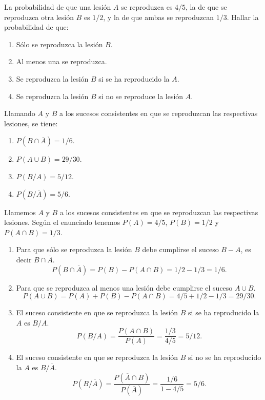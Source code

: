 {La probabilidad de que una lesión $A$ se reproduzca es $4/5$, la de que se reproduzca otra lesión $B$ es $1/2$, y la de que ambas se
reproduzcan $1/3$. Hallar la probabilidad de que:
\begin{enumerate}
\item Sólo se reproduzca la lesión $B$.
\item Al menos una se reproduzca.
\item Se reproduzca la lesión $B$ si se ha reproducido la $A$.
\item Se reproduzca la lesión $B$ si no se reproduce la lesión $A$.
\end{enumerate}
}
{Llamando $A$ y $B$ a los sucesos consistentes en que se reproduzcan las respectivas lesiones, se tiene:
\begin{enumerate}
\item $P(B\cap\overline{A})=1/6$.
\item $P(A\cup B)=29/30$.
\item $P(B/A)=5/12$.
\item $P(B/\overline{A})=5/6$.
\end{enumerate}
}
{Llamemos $A$ y $B$ a los sucesos consistentes en que se reproduzcan las respectivas lesiones. Según el enunciado tenemos
$P(A)=4/5$, $P(B)=1/2$ y $P(A\cap B)=1/3$.

\begin{enumerate}
\item Para que sólo se reproduzca la lesión $B$ debe cumplirse el suceso $B-A$, es decir $B\cap\overline{A}$.
\[P(B\cap\overline{A})=P(B)-P(A\cap B)=1/2-1/3=1/6.\]

\item Para que se reproduzca al menos una lesión debe cumplirse el suceso $A\cup B$.
\[P(A\cup B)=P(A)+P(B)-P(A\cap B)=4/5+1/2-1/3=29/30.\]

\item El suceso consistente en que se reproduzca la lesión $B$ si se ha reproducido la $A$ es $B/A$.
\[P(B/A)=\frac{P(A\cap B)}{P(A)}=\frac{1/3}{4/5}=5/12.\]

\item El suceso consistente en que se reproduzca la lesión $B$ si no se ha reproducido la $A$ es $B/\overline{A}$.
\[P(B/\overline{A})=\frac{P(\overline{A}\cap B)}{P(\overline{A})}=\frac{1/6}{1-4/5}=5/6.\]
\end{enumerate}
}


